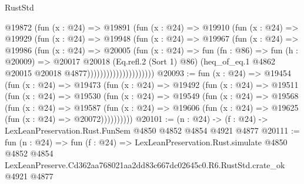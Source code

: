 \begin{lexlean}{RustStd}
\begin{coremodule}
                          @19872
                            (fun (x : @24) =>
                            @19891
                              (fun (x : @24) =>
                              @19910
                                (fun (x : @24) =>
                                @19929
                                  (fun (x : @24) =>
                                  @19948
                                    (fun (x : @24) =>
                                    @19967
                                      (fun (x : @24) =>
                                      @19986
                                        (fun (x : @24) =>
                                        @20005
                                          (fun (x : @24) =>
                                          fun (fn : @86) =>
                                          fun (h : @20009) =>
                                          @20017
                                            @20018
                                            (Eq.refl.{2} (Sort 1) @86)
                                            (heq_of_eq.{1}
                                              @4862
                                              @20015
                                              @20018
                                              @4877)))))))))))))))))))))
@20093 := fun (x : @24) =>
  @19454
    (fun (x : @24) =>
    @19473
      (fun (x : @24) =>
      @19492
        (fun (x : @24) =>
        @19511
          (fun (x : @24) =>
          @19530
            (fun (x : @24) =>
            @19549
              (fun (x : @24) =>
              @19568
                (fun (x : @24) =>
                @19587
                  (fun (x : @24) =>
                  @19606 (fun (x : @24) => @19625 (fun (x : @24) => @20072))))))))))
@20101 := (n : @24) -> (f : @24) -> LexLeanPreservation.Rust.FunSem @4850 @4852 @4854 @4921 @4877
@20111 := fun (n : @24) =>
  fun (f : @24) =>
  LexLeanPreservation.Rust.simulate
    @4850
    @4852
    @4854
    LexLeanPreserve.Cd362aa768021aa2dd83c667dc02645c0.R6.RustStd.crate_ok
    @4921
    @4877
\end{coremodule}
\end{lexlean}
